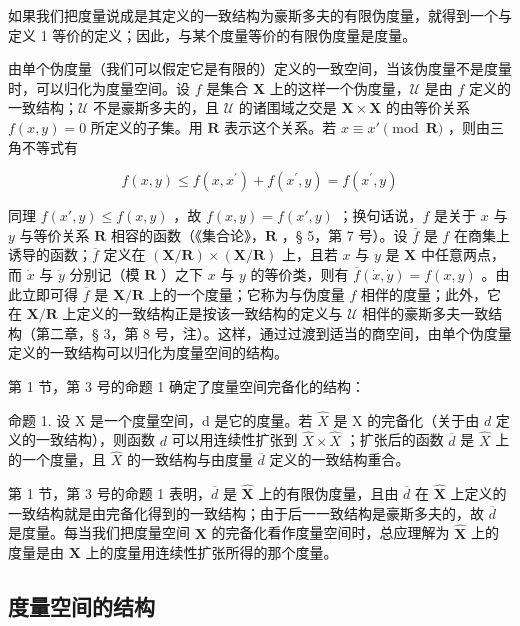 如果我们把度量说成是其定义的一致结构为豪斯多夫的有限伪度量，就得到一个与定义 1 等价的定义；因此，与某个度量等价的有限伪度量是度量。

由单个伪度量（我们可以假定它是有限的）定义的一致空间，当该伪度量不是度量时，可以归化为度量空间。设 \(f\) 是集合 \(\mathbf{X}\) 上的这样一个伪度量，\(\mathcal{U}\) 是由 \(f\) 定义的一致结构；\(\mathcal{U}\) 不是豪斯多夫的，且 \(\mathcal{U}\) 的诸围域之交是 \(\mathbf{X} \times \mathbf{X}\) 的由等价关系 \(f(x,y) = 0\) 所定义的子集。用 \(\mathbf{R}\) 表示这个关系。若 \(x \equiv x' \pmod{\mathbf{R}}\) ，则由三角不等式有

\[
f (x, y) \leqslant f (x, x ^ {\prime}) + f (x ^ {\prime}, y) = f (x ^ {\prime}, y)
\]

同理 \(f(x', y) \leqslant f(x, y)\) ，故 \(f(x, y) = f(x', y)\) ；换句话说，\(f\) 是关于 \(x\) 与 \(y\) 与等价关系 \(\mathbf{R}\) 相容的函数（《集合论》，\(\mathbf{R}\) ，§ 5，第 7 号）。设 \(\overline{f}\) 是 \(f\) 在商集上诱导的函数；\(\overline{f}\) 定义在 \((\mathbf{X}/\mathbf{R}) \times (\mathbf{X}/\mathbf{R})\) 上，且若 \(x\) 与 \(y\) 是 \(\mathbf{X}\) 中任意两点，而 \(\dot{x}\) 与 \(\dot{y}\) 分别记（模 \(\mathbf{R}\) ）之下 \(x\) 与 \(y\) 的等价类，则有 \(\overline{f}(\dot{x}, \dot{y}) = f(x, y)\) 。由此立即可得 \(\overline{f}\) 是 \(\mathbf{X}/\mathbf{R}\) 上的一个度量；它称为与伪度量 \(f\) 相伴的度量；此外，它在 \(\mathbf{X}/\mathbf{R}\) 上定义的一致结构正是按该一致结构的定义与 \(\mathcal{U}\) 相伴的豪斯多夫一致结构（第二章，§ 3，第 8 号，注）。这样，通过过渡到适当的商空间，由单个伪度量定义的一致结构可以归化为度量空间的结构。

第 1 节，第 3 号的命题 1 确定了度量空间完备化的结构：

命题 1. 设 X 是一个度量空间，d 是它的度量。若 \(\hat{X}\) 是 X 的完备化（关于由 \(d\) 定义的一致结构），则函数 \(d\) 可以用连续性扩张到 \(\hat{X} \times \hat{X}\) ；扩张后的函数 \(\overline{d}\) 是 \(\hat{X}\) 上的一个度量，且 \(\hat{X}\) 的一致结构与由度量 \(\overline{d}\) 定义的一致结构重合。

第 1 节，第 3 号的命题 1 表明，\(\overline{d}\) 是 \(\hat{\mathbf{X}}\) 上的有限伪度量，且由 \(\overline{d}\) 在 \(\hat{\mathbf{X}}\) 上定义的一致结构就是由完备化得到的一致结构；由于后一一致结构是豪斯多夫的，故 \(\overline{d}\) 是度量。每当我们把度量空间 \(\mathbf{X}\) 的完备化看作度量空间时，总应理解为 \(\hat{\mathbf{X}}\) 上的度量是由 \(\mathbf{X}\) 上的度量用连续性扩张所得的那个度量。

\subsection{度量空间的结构}


